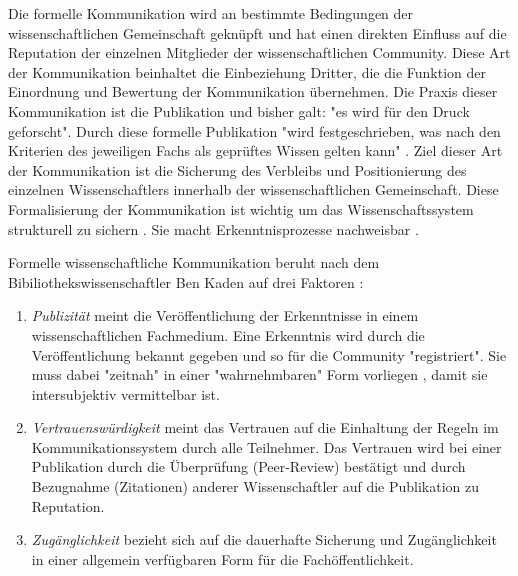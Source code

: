 Die formelle Kommunikation wird an bestimmte Bedingungen der wissenschaftlichen Gemeinschaft geknüpft und hat einen direkten Einfluss auf die Reputation der einzelnen Mitglieder der wissenschaftlichen Community. Diese Art der Kommunikation beinhaltet die Einbeziehung Dritter, die die Funktion der Einordnung und Bewertung der Kommunikation übernehmen. Die Praxis dieser Kommunikation ist die Publikation und bisher galt: "es wird für den Druck geforscht"\cite{luhmann_1997_gesellschaft}. Durch diese formelle Publikation "wird festgeschrieben, was nach den Kriterien des jeweiligen Fachs als geprüftes Wissen gelten kann" \cite{bbaw_publizieren_2015}. Ziel dieser Art der Kommunikation ist die Sicherung des Verbleibs und Positionierung des einzelnen Wissenschaftlers innerhalb der wissenschaftlichen Gemeinschaft. Diese Formalisierung der Kommunikation ist wichtig um das Wissenschaftssystem strukturell zu sichern \cite{kaden_2009_library}. Sie macht Erkenntnisprozesse nachweisbar \cite{kaden_2009_library}.

Formelle wissenschaftliche Kommunikation beruht nach dem Bibiliothekswissenschaftler Ben Kaden auf drei Faktoren \cite{kaden_2009_library}:
\begin{enumerate}
\item \textit{Publizität} meint die Veröffentlichung der Erkenntnisse in einem wissenschaftlichen Fachmedium. Eine Erkenntnis wird durch die Veröffentlichung bekannt gegeben und so für die Community "registriert".  Sie muss dabei "zeitnah" in einer "wahrnehmbaren" Form vorliegen \cite{Schimank_2012}, damit sie intersubjektiv vermittelbar ist.
\item \textit{Vertrauenswürdigkeit} meint das Vertrauen auf die Einhaltung der Regeln im Kommunikationssystem durch alle Teilnehmer. Das Vertrauen wird bei einer Publikation durch die Überprüfung (Peer-Review) bestätigt und durch Bezugnahme (Zitationen) anderer Wissenschaftler auf die Publikation zu Reputation.
\item \textit{Zugänglichkeit} bezieht sich auf die dauerhafte Sicherung und Zugänglichkeit in einer allgemein verfügbaren Form für die Fachöffentlichkeit.
\end{enumerate}

